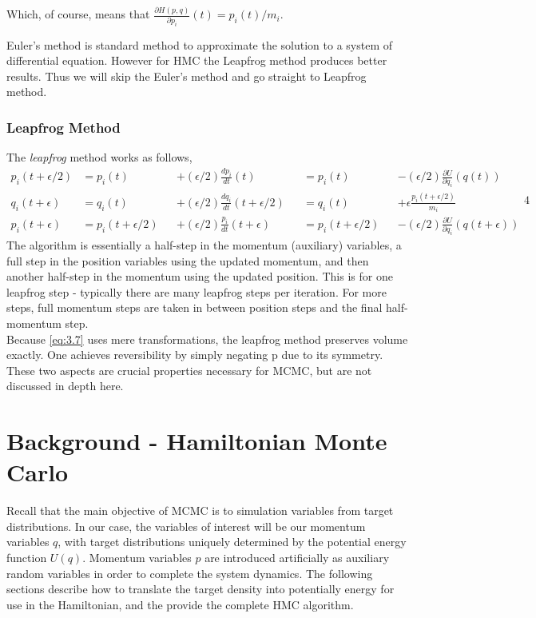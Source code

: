 \documentclass{article}
\numberwithin{equation}{section}
\begin{document}
Which, of course, means that $\frac{\partial H(p,q)}{\partial p_i}(t) = p_i(t)/m_i$.

Euler's method is standard method to approximate the solution to a system of differential equation. However for HMC the Leapfrog method produces better results. Thus we will skip the Euler's method and go straight to Leapfrog method.

\subsubsection{Leapfrog Method}
The \textit{leapfrog} method works as follows,
\begin{equation}
\begin{alignedat}{4}
p_i(t+\epsilon/2) &=  p_i(t) &&+ (\epsilon/2)\frac{dp_i}{dt}(t) &&=   p_i(t) &&- (\epsilon/2)\frac{\partial U}{\partial q_i}(q(t))\\
q_i(t+\epsilon)   &= q_i(t) &&+ (\epsilon/2)\frac{dq_i}{dt}(t + \epsilon/2) &&=  q_i(t) &&+ \epsilon \frac{p_i(t+\epsilon/2)}{m_i}\\
p_i(t+\epsilon) &= p_i(t + \epsilon/2) &&+ (\epsilon/2)\frac{p_i}{dt}(t + \epsilon) &&= p_i(t+\epsilon/2) &&- (\epsilon/2)\frac{\partial U}{\partial q_i}(q(t+\epsilon))
\label{eq:3.7}
\end{alignedat}{4}
\end{equation}
The algorithm is essentially a half-step in the momentum (auxiliary) variables, a full step in the position variables using the updated momentum, and then another half-step in the momentum using the updated position. This is for one leapfrog step - typically there are many leapfrog steps per iteration. For more steps, full momentum steps are taken in between position steps and the final half-momentum step.\\

Because \ref{eq:3.7} uses mere transformations, the leapfrog method preserves volume exactly. One achieves reversibility by simply negating p due to its symmetry. These two aspects are crucial properties necessary for MCMC, but are not discussed in depth here.

\section{Background - Hamiltonian Monte Carlo}
Recall that the main objective of MCMC is to simulation variables from target distributions. In our case, the variables of interest will be our momentum variables $q$, with target distributions uniquely determined by the potential energy function $U(q)$. Momentum variables $p$ are introduced artificially as auxiliary random variables in order to complete the system dynamics. The following sections describe how to translate the target density into potentially energy for use in the Hamiltonian, and the provide the complete HMC algorithm.\\
\end{document}
